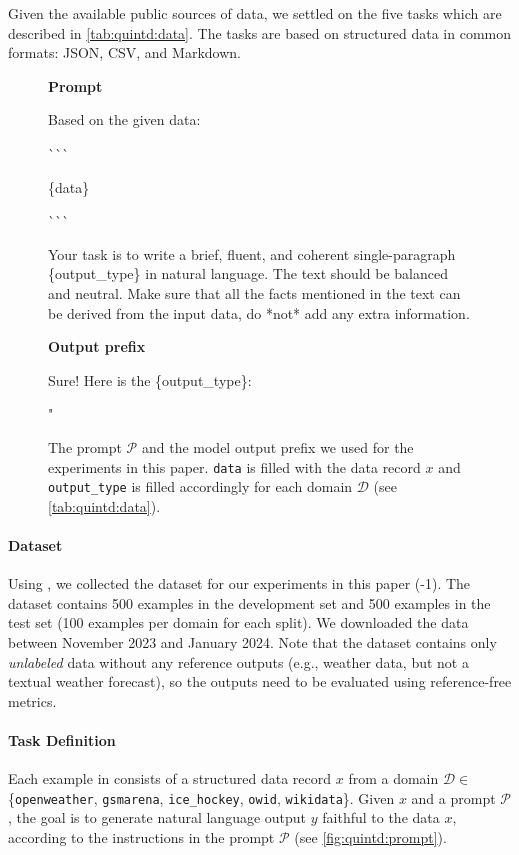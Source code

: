 Given the available public sources of data, we settled on the five tasks which are described in \autoref{tab:quintd:data}. The tasks are based on structured data in common formats: JSON, CSV, and Markdown.


\begin{figure}[t]
    \centering
    \small
    \textbf{Prompt}
    \begin{verbatimbox}
        Based on the given data:

        \`{}\`{}\`{}

        \{data\}

        \`{}\`{}\`{}

        Your task is to write a brief, fluent, and
        coherent single-paragraph \{output\_type\} in natural
        language. The text should be balanced and neutral.
        Make sure that all the facts mentioned in the text
        can be derived from the input data, do *not* add
        any extra information.
    \end{verbatimbox}
    \textbf{Output prefix}
    \begin{verbatimbox}
        Sure! Here is the \{output\_type\}:

        "
    \end{verbatimbox}
    \caption{The prompt $\mathcal{P}$ and the model output prefix we used for the experiments in this paper. \texttt{data} is filled with the data record  $x$ and \texttt{output\_type} is filled accordingly for each domain $\mathcal{D}$ (see \autoref{tab:quintd:data}).}
    \label{fig:quintd:prompt}
\end{figure}


\paragraph{\benchmark{} Dataset}
\label{sec:quintd:dataset}
Using \datatool{}, we collected the dataset for our experiments in this paper (\datatool{}-1). The dataset contains 500 examples in the development set and 500 examples in the test set (100 examples per domain for each split).
We downloaded the data between November 2023 and January 2024. Note that the dataset contains only \emph{unlabeled} data without any reference outputs (e.g., weather data, but not a textual weather forecast), so the outputs need to be evaluated using reference-free metrics.



\paragraph{Task Definition}
Each example in \benchmark{} consists of a structured data record $x$ from a domain $\mathcal{D} \in $ \{\texttt{openweather}, \texttt{gsmarena}, \texttt{ice\_hockey}, \texttt{owid}, \texttt{wikidata}\}. Given $x$ and a prompt $\mathcal{P}$, the goal is to generate natural language output $y$ faithful to the data $x$, according to the instructions in the prompt $\mathcal{P}$ (see \autoref{fig:quintd:prompt}).




